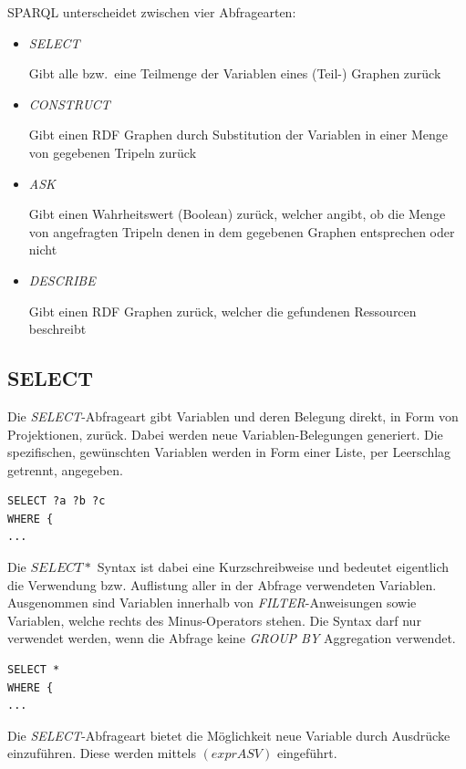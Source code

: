 SPARQL unterscheidet zwischen vier Abfragearten:
\begin{itemize}
    \item \textit{SELECT}

        Gibt alle bzw.\ eine Teilmenge der Variablen eines (Teil-) Graphen zurück
    \item \textit{CONSTRUCT}

        Gibt einen RDF Graphen durch Substitution der Variablen in einer Menge von gegebenen Tripeln zurück
    \item \textit{ASK}

        Gibt einen Wahrheitswert (Boolean) zurück, welcher angibt, ob die Menge von angefragten Tripeln denen in dem gegebenen Graphen entsprechen oder nicht
    \item \textit{DESCRIBE}

        Gibt einen RDF Graphen zurück, welcher die gefundenen Ressourcen beschreibt
\end{itemize}

\subsection{SELECT}
\label{subsec:sparql_abfragearten_select}
Die \textit{SELECT}-Abfrageart gibt Variablen und deren Belegung direkt, in Form von Projektionen, zurück. Dabei werden neue Variablen-Belegungen generiert. Die spezifischen, gewünschten Variablen werden in Form einer Liste, per Leerschlag getrennt, angegeben.

\begin{lstlisting}
SELECT ?a ?b ?c
WHERE {
...
\end{lstlisting}

Die $ SELECT * $ Syntax ist dabei eine Kurzschreibweise und bedeutet eigentlich die Verwendung bzw. Auflistung aller in der Abfrage verwendeten Variablen. Ausgenommen sind Variablen innerhalb von \textit{FILTER}-Anweisungen sowie Variablen, welche rechts des Minus-Operators stehen. Die Syntax darf nur verwendet werden, wenn die Abfrage keine \textit{GROUP BY} Aggregation verwendet.
\begin{lstlisting}
SELECT *
WHERE {
...
\end{lstlisting}

Die \textit{SELECT}-Abfrageart bietet die Möglichkeit neue Variable durch Ausdrücke einzuführen. Diese werden mittels $(expr AS V)$ eingeführt.

